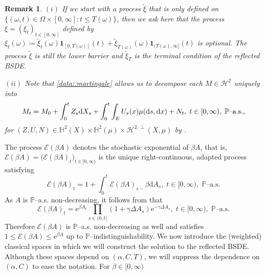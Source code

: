 \documentclass[10pt]{article} %
\newtheorem{remark}[theorem]{Remark}
\newcommand\cE{\mathcal E}
\newcommand\cH{\mathcal H}
\def \H{\mathbb{H}}
\def \P{\mathbb{P}}
\def\d{\mathrm{d}}
\begin{document}
\begin{remark}\label{rem::after_data}
$(i)$ If we start with a process $\tilde\xi$ that is only defined on $\{(\omega,t) \in \Omega \times [0,\infty] : t \leq T(\omega)\}$, then we ask here that the process $\xi = (\xi_t)_{t \in [0,\infty]}$ defined by $\xi_t(\omega) \coloneqq \tilde\xi_t(\omega) \mathbf{1}_{[0,T(\omega)]}(t) + \tilde\xi_{T(\omega)}(\omega) \mathbf{1}_{(T(\omega),\infty]}(t)$ is optional. The process $\tilde\xi$ is still the lower barrier and $\tilde\xi_T$ is the terminal condition of the reflected {\rm BSDE}.

\medskip
$(ii)$ Note that \ref{data::martingale} allows us to decompose each $M \in \cH^2$ uniquely into
\begin{equation*}
	M_t = M_0 + \int_0^t Z_s \d X_s + \int_0^t \int_E U_s(x) \mu(\d s, \d x) + N_t, \; t \in [0,\infty), \; \text{$\P$\rm--a.s.},
\end{equation*}
for $(Z,U,N) \in \H^2(X) \times \H^2(\mu) \times \cH^{2,\perp}(X,\mu)$ by {\rm{}}.
\end{remark}

The process $\cE(\beta A)$ denotes the stochastic exponential of $\beta A$, that is, $\cE(\beta A) = \big(\cE(\beta A)_t\big)_{t \in [0,\infty)}$ is the unique right-continuous, adapted process satisfying
\begin{equation*}
	\cE(\beta A)_t = 1 + \int_0^t \cE(\beta A)_{s-}\beta \d A_s, \; t \in [0,\infty), \; \text{$\P$--a.s.}
\end{equation*}
As $A$ is $\P$--a.s. non-decreasing, it follows from \cite[Theorem I.4.61]{jacod2003limit} that
\begin{equation*}
	\displaystyle \cE(\beta A)_t = \mathrm{e}^{\beta A_t} \prod_{s \in (0,t]}(1+\gamma\Delta A_s)\mathrm{e}^{-\gamma\Delta A_s}, \; t \in [0,\infty), \; \text{$\P$--a.s.}
\end{equation*}
Therefore $\cE(\beta A)$ is $\P$--a.s. non-decreasing as well and satisfies $1\leq\cE(\beta A)\leq\mathrm{e}^{\beta A}$ up to $\P$--indistinguishability.
We now introduce the (weighted) classical spaces in which we will construct the solution to the reflected BSDE. Although these spaces depend on $(\alpha,C,T)$, we will suppress the dependence on $(\alpha,C)$ to ease the notation. For $\beta \in [0,\infty)$
\end{document}
